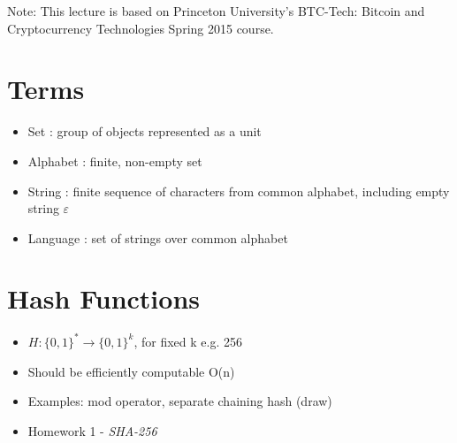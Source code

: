 \documentclass{article}
\begin{document}
\maketitle

Note: This lecture is based on Princeton University's BTC-Tech: Bitcoin and Cryptocurrency Technologies Spring 2015 course.

\section*{Terms}
\begin{itemize}
  \item Set : group of objects represented as a unit
  \item Alphabet : finite, non-empty set
  \item String : finite sequence of characters from common alphabet, including empty string $\varepsilon$
  \item Language : set of strings over common alphabet
\end{itemize}

\section*{Hash Functions}
\begin{itemize}
  \item $H: \{0,1\}^* \rightarrow \{0,1\}^k$, for fixed k e.g. 256
  \item Should be efficiently computable O(n)
  \item Examples: mod operator, separate chaining hash (draw)
  \item Homework 1 - \emph{SHA-256}
\end{itemize}
\end{document}
